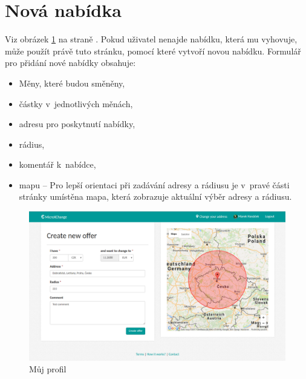 \section{Nová nabídka}

\label{nur:new-offer}

Viz obrázek \ref{fig:tur:new-offer} na straně \pageref{fig:tur:new-offer}. Pokud uživatel nenajde nabídku, která mu vyhovuje, může použít právě tuto stránku, pomocí které vytvoří novou nabídku. Formulář pro přidání nové nabídky obsahuje:
\begin{itemize}
    \item Měny, které budou směněny,
    \item částky v~jednotlivých měnách,
	\item adresu pro poskytnutí nabídky,
	\item rádius,
	\item komentář k~nabídce,
	\item mapu -- Pro lepší orientaci při zadávání adresy a rádiusu je v~pravé části stránky umístěna mapa, která zobrazuje aktuální výběr adresy a rádiusu.
\end{itemize}

\begin{figure}[!h]
    \centering
    \includegraphics[width=1.0\textwidth]{media/tur/new-offer.png}
    \caption{Můj profil}
    \label{fig:tur:new-offer}
\end{figure}